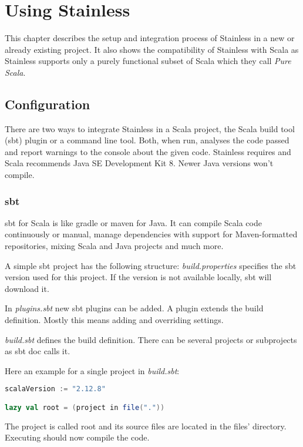 \chapter{Using Stainless}
\label{chap:using_stainless}
This chapter describes the setup and integration process of Stainless in a new or already existing project.
It also shows the compatibility of Stainless with Scala as Stainless supports only a purely functional subset of Scala which they call \emph{Pure Scala}.

\section{Configuration}
There are two ways to integrate Stainless in a Scala project, the Scala build tool (sbt) plugin or a command line tool.
Both, when run, analyses the code passed and report warnings to the console about the given code.
Stainless requires and Scala recommends Java SE Development Kit 8.
Newer Java versions won't compile.

\subsection{sbt}
sbt for Scala is like gradle or maven for Java.
It can compile Scala code continuously or manual, manage dependencies with support for Maven-formatted repositories, mixing Scala and Java projects and much more.

A simple sbt project has the following structure:
\emph{build.properties} specifies the sbt version used for this project.
If the version is not available locally, sbt will download it.

In \emph{plugins.sbt} new sbt plugins can be added.
A plugin extends the build definition.
Mostly this means adding and overriding settings.

\emph{build.sbt} defines the build definition.
There can be several projects or subprojects as sbt doc calls it.

Here an example for a single project in \emph{build.sbt}:
\begin{lstlisting}[language=scala]
scalaVersion := "2.12.8"

lazy val root = (project in file("."))
\end{lstlisting}
The project is called root and its source files are located in the files' directory.
Executing  should now compile the code.

